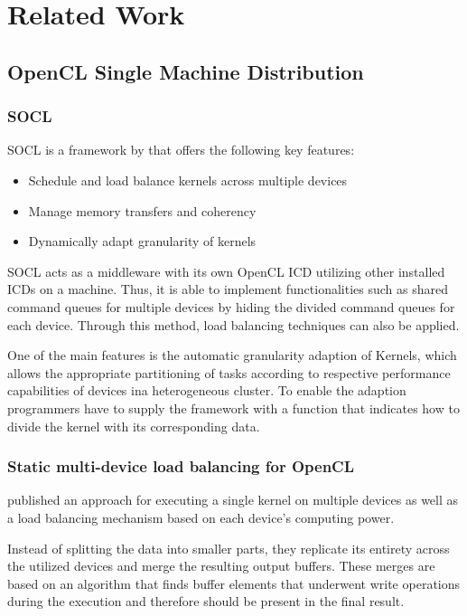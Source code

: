 \chapter{Related Work}
\label{related}

\section{OpenCL Single Machine Distribution}

\subsection*{SOCL}
SOCL is a framework by \citeauthor{socl} that offers the following key features\cite{socl}:
\begin{itemize}
    \item Schedule and load balance kernels across multiple devices
    \item Manage memory transfers and coherency
    \item Dynamically adapt granularity of kernels
\end{itemize}

SOCL acts as a middleware with its own OpenCL ICD utilizing other installed ICDs on a machine. Thus, it is able to implement functionalities such as shared command queues for multiple devices by hiding the divided command queues for each device. Through this method, load balancing techniques can also be applied.

One of the main features is the automatic granularity adaption of Kernels, which allows the appropriate partitioning of tasks according to respective performance capabilities of devices ina heterogeneous cluster. To enable the adaption programmers have to supply the framework with a function that indicates how to divide the kernel with its corresponding data.

\subsection*{Static multi-device load balancing for OpenCL}
\citeauthor{delalama_2012} published an approach for executing a single kernel on multiple devices as well as a load balancing mechanism based on each device's computing power\cite{delalama_2012}.

Instead of splitting the data into smaller parts, they replicate its entirety across the utilized devices and merge the resulting output buffers. These merges are based on an algorithm that finds buffer elements that underwent write operations during the execution and therefore should be present in the final result.

